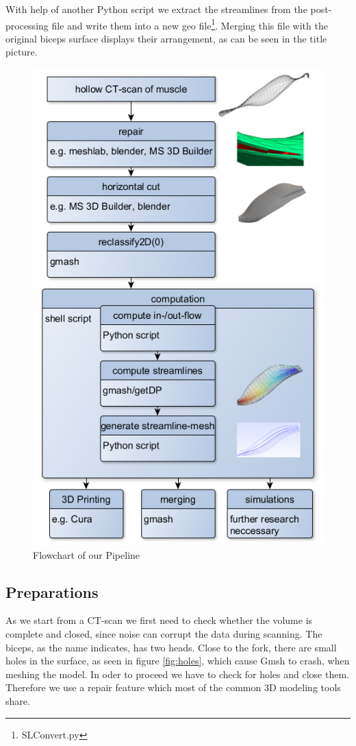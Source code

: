 \documentclass[preprint,journal]{vgtc}       %
\begin{document}
With help of another Python script we extract the streamlines from the post-processing file and write them into a new geo file\footnote{SLConvert.py}. 
Merging this file with the original biceps surface displays their arrangement, as can be seen in the title picture.
\begin{figure} 
	\begin{center}
		\includegraphics[width=0.79\linewidth]{flow006.png}
	\end{center}
	\caption{Flowchart of our Pipeline}
	\label{fig:flow}
	
\end{figure}
\subsection{Preparations}
As we start from a CT-scan we first need to check whether the volume is complete and closed, since noise can corrupt the data during scanning.
The biceps, as the name indicates, has two heads. 
Close to the fork, there are small holes in the surface, as seen  in figure \ref{fig:holes}, which cause Gmsh to crash, when meshing the model. 
In oder to proceed we have to check for holes and close them.
Therefore we use a repair feature which most of the common 3D modeling tools share. 
\end{document}
